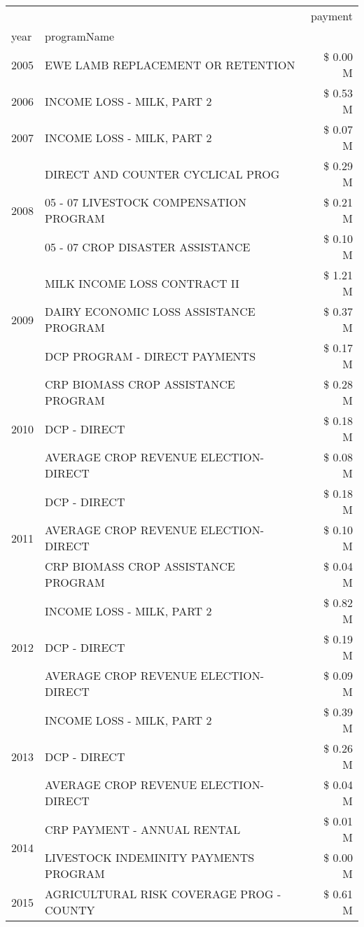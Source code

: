 \begin{tabular}{llr}
\toprule
 &  & payment \\
year & programName &  \\
\midrule
2005 & EWE LAMB REPLACEMENT OR RETENTION & \$ 0.00 M \\
\cline{1-3}
2006 & INCOME LOSS - MILK, PART 2 & \$ 0.53 M \\
\cline{1-3}
2007 & INCOME LOSS - MILK, PART 2 & \$ 0.07 M \\
\cline{1-3}
\multirow[t]{3}{*}{2008} & DIRECT AND COUNTER CYCLICAL PROG & \$ 0.29 M \\
 & 05 - 07 LIVESTOCK COMPENSATION PROGRAM & \$ 0.21 M \\
 & 05 - 07 CROP DISASTER ASSISTANCE & \$ 0.10 M \\
\cline{1-3}
\multirow[t]{3}{*}{2009} & MILK INCOME LOSS CONTRACT II & \$ 1.21 M \\
 & DAIRY ECONOMIC LOSS ASSISTANCE PROGRAM & \$ 0.37 M \\
 & DCP PROGRAM - DIRECT PAYMENTS & \$ 0.17 M \\
\cline{1-3}
\multirow[t]{3}{*}{2010} & CRP BIOMASS CROP ASSISTANCE PROGRAM & \$ 0.28 M \\
 & DCP - DIRECT & \$ 0.18 M \\
 & AVERAGE CROP REVENUE ELECTION-DIRECT & \$ 0.08 M \\
\cline{1-3}
\multirow[t]{3}{*}{2011} & DCP - DIRECT & \$ 0.18 M \\
 & AVERAGE CROP REVENUE ELECTION-DIRECT & \$ 0.10 M \\
 & CRP BIOMASS CROP ASSISTANCE PROGRAM & \$ 0.04 M \\
\cline{1-3}
\multirow[t]{3}{*}{2012} & INCOME LOSS - MILK, PART 2 & \$ 0.82 M \\
 & DCP - DIRECT & \$ 0.19 M \\
 & AVERAGE CROP REVENUE ELECTION-DIRECT & \$ 0.09 M \\
\cline{1-3}
\multirow[t]{3}{*}{2013} & INCOME LOSS - MILK, PART 2 & \$ 0.39 M \\
 & DCP - DIRECT & \$ 0.26 M \\
 & AVERAGE CROP REVENUE ELECTION-DIRECT & \$ 0.04 M \\
\cline{1-3}
\multirow[t]{2}{*}{2014} & CRP PAYMENT - ANNUAL RENTAL & \$ 0.01 M \\
 & LIVESTOCK INDEMINITY PAYMENTS PROGRAM & \$ 0.00 M \\
\cline{1-3}
\multirow[t]{3}{*}{2015} & AGRICULTURAL RISK COVERAGE PROG - COUNTY & \$ 0.61 M \\

\end{tabular}
